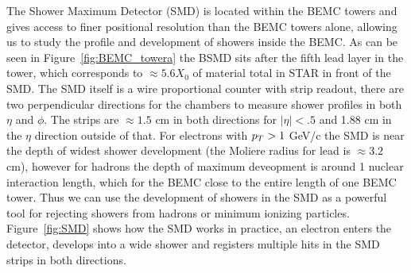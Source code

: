 The Shower Maximum Detector (SMD) is located within the BEMC towers and gives access to finer positional resolution than the BEMC towers alone, allowing us to study the profile and development of showers inside the BEMC. As can be seen in Figure~\ref{fig:BEMC_towera} the BSMD sits after the fifth lead layer in the tower, which corresponds to $\approx 5.6 X_{0}$ of material total in STAR in front of the SMD. The SMD itself is a wire proportional counter with strip readout, there are two perpendicular directions for the chambers to measure shower profiles in both $\eta$ and $\phi$. The strips are $\approx 1.5$ cm in both directions for $|\eta| < .5$ and 1.88 cm in the $\eta$ direction outside of that. For electrons with $p_{T} > 1$ GeV/c the SMD is near the depth of widest shower development (the Moliere radius for lead is $\approx 3.2$ cm), however for hadrons the depth of maximum deveopment is around 1 nuclear interaction length, which for the BEMC close to the entire length of one BEMC tower. Thus we can use the development of showers in the SMD as a powerful tool for rejecting showers from hadrons or minimum ionizing particles. Figure~\ref{fig:SMD} shows how the SMD works in practice, an electron enters the detector, develops into a wide shower and registers multiple hits in the SMD strips in both directions.

